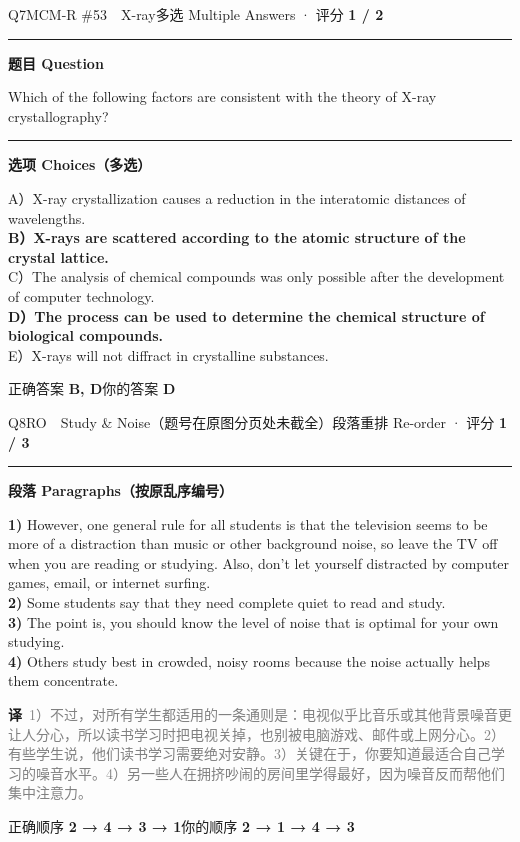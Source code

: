 \documentclass[11pt]{article}
\newcommand{\ptesub}[1]{%
  \par\needspace{2\baselineskip}\smallskip
  {\color{cAccent}\rule[-0.2ex]{3pt}{1.05em}}\hspace{6pt}%
  {\bfseries\color{cHead}#1}\par\nopagebreak\smallskip}
\newcommand{\zh}[1]{{\footnotesize\textcolor{cNote}{\textbf{译}}\ \textcolor{gray}{#1}}}
\begin{document}
\begin{qblock}{Q7\quad MCM-R \#53\ \ X-ray}{多选 Multiple Answers · 评分 \textcolor{cAccent}{\bfseries 1 / 2}}
\ptesub{题目 Question}
\begin{notebox}\small Which of the following factors are consistent with the theory of X-ray crystallography?\end{notebox}
\ptesub{选项 Choices（多选）}
{\small
A）X-ray crystallization causes a reduction in the interatomic distances of wavelengths.\\
{\color{cFix}\textbf{B）X-rays are scattered according to the atomic structure of the crystal lattice.}}\\
C）The analysis of chemical compounds was only possible after the development of computer technology.\\
{\color{cFix}\textbf{D）The process can be used to determine the chemical structure of biological compounds.}}\\
E）X-rays will not diffract in crystalline substances.}
\smallskip\par
{\small 正确答案 \textcolor{cFix}{\bfseries B, D}\qquad 你的答案 {\color{cWrong}\bfseries D}}
\end{qblock}

\begin{qblock}{Q8\quad RO\ \ Study \& Noise（题号在原图分页处未截全）}{段落重排 Re-order · 评分 \textcolor{cAccent}{\bfseries 1 / 3}}
\ptesub{段落 Paragraphs（按原乱序编号）}
\begin{promptbox}\small
\textbf{1)} However, one general rule for all students is that the television seems to be more of a distraction than music or other background noise, so leave the TV off when you are reading or studying. Also, don't let yourself distracted by computer games, email, or internet surfing.\\[2pt]
\textbf{2)} Some students say that they need complete quiet to read and study.\\[2pt]
\textbf{3)} The point is, you should know the level of noise that is optimal for your own studying.\\[2pt]
\textbf{4)} Others study best in crowded, noisy rooms because the noise actually helps them concentrate.
\end{promptbox}
\zh{1）不过，对所有学生都适用的一条通则是：电视似乎比音乐或其他背景噪音更让人分心，所以读书学习时把电视关掉，也别被电脑游戏、邮件或上网分心。2）有些学生说，他们读书学习需要绝对安静。3）关键在于，你要知道最适合自己学习的噪音水平。4）另一些人在拥挤吵闹的房间里学得最好，因为噪音反而帮他们集中注意力。}
\smallskip\par
{\small 正确顺序 \textcolor{cFix}{\bfseries 2 → 4 → 3 → 1}\qquad 你的顺序 {\color{cWrong}\bfseries 2 → 1 → 4 → 3}}
\end{qblock}
\end{document}

